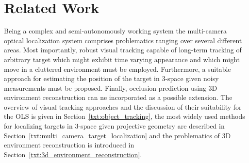 \chapter{Related Work}

Being a complex and semi-autonomously working system the multi-camera optical localization system comprises problematics ranging over several different areas. Most importantly, robust visual tracking capable of long-term tracking of arbitrary target which might exhibit time varying appearance and which might move in a cluttered environment must be employed. Furthermore, a suitable approach for estimating the position of the target in 3-space given noisy measurements must be proposed. Finally, occlusion prediction using 3D environment reconstruction can ne incorporated as a possible extension. The overview of visual tracking approaches and the discussion of their suitability for the OLS is given in Section~\ref{txt:object_tracking}, the most widely used methods for localizing targets in 3-space given projective geometry are described in Section~\ref{txt:multi_camera_target_localization} and the problematics of 3D environment reconstruction is introduced in Section~\ref{txt:3d_environment_reconstruction}.


